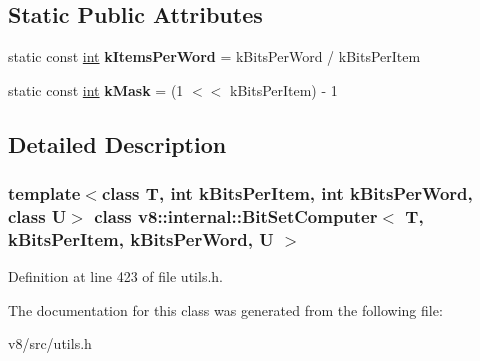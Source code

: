 \subsection*{Static Public Attributes}
\begin{DoxyCompactItemize}
\item 
\mbox{\label{classv8_1_1internal_1_1BitSetComputer_aa0be907049a9a722cae553a380435bd3}} 
static const \mbox{\hyperlink{classint}{int}} {\bfseries k\+Items\+Per\+Word} = k\+Bits\+Per\+Word / k\+Bits\+Per\+Item
\item 
\mbox{\label{classv8_1_1internal_1_1BitSetComputer_aad919c363a83f30498923ca8122d780e}} 
static const \mbox{\hyperlink{classint}{int}} {\bfseries k\+Mask} = (1 $<$$<$ k\+Bits\+Per\+Item) -\/ 1
\end{DoxyCompactItemize}


\subsection{Detailed Description}
\subsubsection*{template$<$class T, int k\+Bits\+Per\+Item, int k\+Bits\+Per\+Word, class U$>$\newline
class v8\+::internal\+::\+Bit\+Set\+Computer$<$ T, k\+Bits\+Per\+Item, k\+Bits\+Per\+Word, U $>$}



Definition at line 423 of file utils.\+h.



The documentation for this class was generated from the following file\+:\begin{DoxyCompactItemize}
\item 
v8/src/utils.\+h\end{DoxyCompactItemize}
